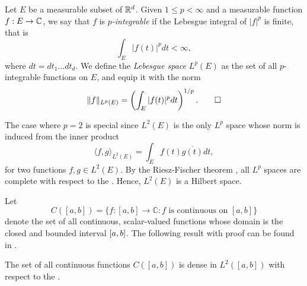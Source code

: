 \documentclass[../thesis.tex]{subfiles}
\begin{document}
\begin{definition}
    Let $E$ be a measurable subset of $\mathbb{R}^d$. Given $1 \leq p < \infty$ and a measurable function $f:E\rightarrow \mathbb{C}$, we say that $f$ is \emph{$p$-integrable} if the Lebesgue integral of $|f|^p$ is finite, that is
    \begin{equation*}
        \int_{E} |f(t)|^p dt < \infty,
    \end{equation*}
    where $dt= dt_1 \dots dt_d$. We define the \emph{Lebesgue space} $L^p(E)$ as the set of all $p$-integrable functions on $E$, and equip it with the norm
    \begin{equation*}
        \|f\|_{L^p(E)} = \left(\int_{E} |f(t)|^p dt\right)^{1/p}. \qedhere
    \end{equation*}
\end{definition}

The case where $p=2$ is special since $L^2(E)$ is the only $L^p$ space whose norm is induced from the inner product
\begin{equation}
    \langle f, g\rangle_{L^2(E)} = \int_{E} f(t)\overline{g(t)} dt,
\end{equation}
for two functions $f,g\in L^2(E)$. By the Riesz-Fischer theorem \cite[p.~279]{heilIntroductionRealAnalysis2019}, all $L^p$ spaces are complete with respect to the \LPnorm. Hence, $L^2(E)$ is a Hilbert space. 



Let
\begin{equation}
    C([a,b]) = \{f:[a,b] \rightarrow \mathbb{C}: f \text{ is continuous on } [a,b]\}
\end{equation}
denote the set of all continuous, scalar-valued functions whose domain is the closed and bounded interval $[a,b]$. The following result with proof can be found in \cite[p.~326]{rudinPrinciplesMathematicalAnalysis20}. 
\begin{lemma}\label{lem:c_dense_L2}
    The set of all continuous functions $C([a,b])$ is dense in $L^2([a,b])$ with respect to the \Ltwonorm .
\end{lemma}
\end{document}
